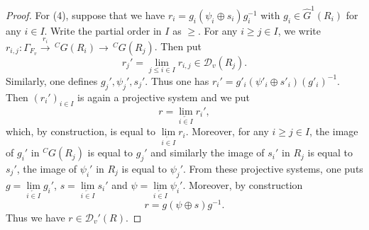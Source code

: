 \documentclass[12pt,oneside,reqno]{amsart}
\theoremstyle{plain}
\begin{document}
\begin{proof}
		
		For (4),
		suppose that we have
		$r_i=g_i(\psi_i\oplus s_i)g_i^{-1}$
		with
		$g_i\in\widehat{G}^1(R_i)$
		for any
		$i\in I$.
		Write the partial order in
		$I$ as $\ge$.
		For any
		$i\ge j\in I$,
		we write
		$r_{i,j}
		\colon
		\Gamma_{F_v}
		\xrightarrow{r_i}
		\,^CG(R_i)
		\rightarrow
		\,^CG(R_j)$.
		Then put
		\[
		r_j'=\lim\limits_{j\le i\in I}
		r_{i,j}
		\in
		\mathcal{D}_v(R_j).
		\]
		Similarly, one defines
		$g_j',\psi_j',s_j'$.
		Thus one has
		$r_i'=g'_i(\psi'_i\oplus s'_i)(g'_i)^{-1}$.
		Then
		$(r_i')_{i\in I}$
		is again a projective system
		and we put
		\[
		r=\lim\limits_{\overleftarrow{i\in I}}r_i',
		\]
		which,
		by construction,
		is equal to
		$\lim\limits_{\overleftarrow{i\in I}}r_i$.
		Moreover,
		for any
		$i\ge j\in I$,
		the image of
		$g_i'$
		in
		$^CG(R_j)$
		is equal to
		$g_j'$
		and similarly the image of
		$s_i'$ in
		$R_j$
		is equal to
		$s_j'$,
		the image of
		$\psi_i'$ in $R_j$ is equal to
		$\psi_j'$.
		From these projective systems,
		one puts
		$g=\lim\limits_{\overleftarrow{i\in I}}g_i'$,
		$s=\lim\limits_{\overleftarrow{i\in I}}s_i'$
		and
		$\psi=\lim\limits_{\overleftarrow{i\in I}}\psi_i'$.
		Moreover,
		by construction
		\[
		r=g(\psi\oplus s)g^{-1}.
		\]
		Thus we have
		$r\in\mathcal{D}_v'(R)$.
	\end{proof}
	
	
	
	
	
	
	
	
	
	
	
\end{document}
